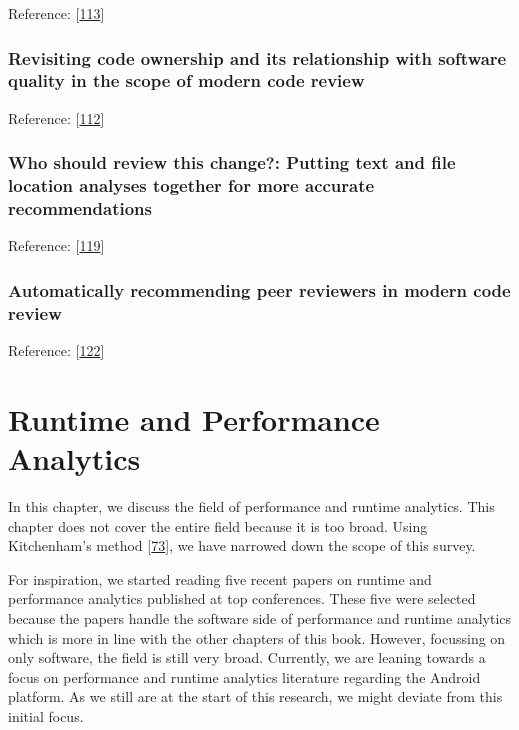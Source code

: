 \documentclass[]{book}
\begin{document}
Reference: {[}\protect\hyperlink{ref-thongtanunam2015should}{113}{]}

\subsection{Revisiting code ownership and its relationship with software
quality in the scope of modern code
review}\label{revisiting-code-ownership-and-its-relationship-with-software-quality-in-the-scope-of-modern-code-review}

Reference: {[}\protect\hyperlink{ref-thongtanunam2016revisiting}{112}{]}

\subsection{Who should review this change?: Putting text and file
location analyses together for more accurate
recommendations}\label{who-should-review-this-change-putting-text-and-file-location-analyses-together-for-more-accurate-recommendations}

Reference: {[}\protect\hyperlink{ref-xia2015should}{119}{]}

\subsection{Automatically recommending peer reviewers in modern code
review}\label{automatically-recommending-peer-reviewers-in-modern-code-review}

Reference: {[}\protect\hyperlink{ref-zanjani2016automatically}{122}{]}

\chapter{Runtime and Performance
Analytics}\label{runtime-and-performance-analytics}

In this chapter, we discuss the field of performance and runtime
analytics. This chapter does not cover the entire field because it is
too broad. Using Kitchenham's method
{[}\protect\hyperlink{ref-kitchenham2004procedures}{73}{]}, we have
narrowed down the scope of this survey.

For inspiration, we started reading five recent papers on runtime and
performance analytics published at top conferences. These five were
selected because the papers handle the software side of performance and
runtime analytics which is more in line with the other chapters of this
book. However, focussing on only software, the field is still very
broad. Currently, we are leaning towards a focus on performance and
runtime analytics literature regarding the Android platform. As we still
are at the start of this research, we might deviate from this initial
focus.
\end{document}
